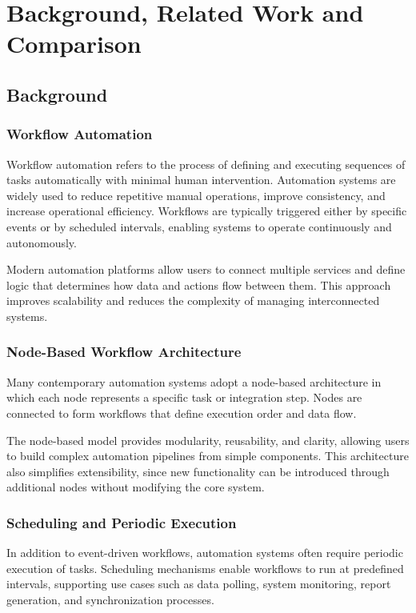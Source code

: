 \chapter{Background, Related Work and Comparison}

\section{Background}

\subsection{Workflow Automation}
Workflow automation refers to the process of defining and executing sequences of tasks automatically with minimal human intervention. Automation systems are widely used to reduce repetitive manual operations, improve consistency, and increase operational efficiency. Workflows are typically triggered either by specific events or by scheduled intervals, enabling systems to operate continuously and autonomously.

Modern automation platforms allow users to connect multiple services and define logic that determines how data and actions flow between them. This approach improves scalability and reduces the complexity of managing interconnected systems.

\subsection{Node-Based Workflow Architecture}
Many contemporary automation systems adopt a node-based architecture in which each node represents a specific task or integration step. Nodes are connected to form workflows that define execution order and data flow.

The node-based model provides modularity, reusability, and clarity, allowing users to build complex automation pipelines from simple components. This architecture also simplifies extensibility, since new functionality can be introduced through additional nodes without modifying the core system.

\subsection{Scheduling and Periodic Execution}
In addition to event-driven workflows, automation systems often require periodic execution of tasks. Scheduling mechanisms enable workflows to run at predefined intervals, supporting use cases such as data polling, system monitoring, report generation, and synchronization processes.

